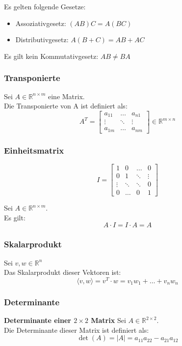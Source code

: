 \documentclass[10pt,a4paper]{article}
\begin{document}
Es gelten folgende Gesetze:
\begin{itemize}
	\item Assoziativgesetz: $(AB)C = A(BC)$
	\item Distributivgesetz: $A(B + C) = AB + AC$
\end{itemize}

Es gilt kein Kommutativgesetz:
$AB ≠ BA$

\subsubsection{Transponierte}
Sei $A \in \mathbb{R}^{n \times m}$ eine Matrix. \\
Die Transponierte von A ist definiert als:
$$
	A^T =  \begin{bmatrix}
	a_{11} & \dots & a_{n1} \\
	\vdots & \ddots & \vdots \\
	a_{1m} & \dots & a_{nm}
	\end{bmatrix} \in \mathbb{R}^{m \times n}
$$

\subsubsection{Einheitsmatrix}
$$
I = \begin{bmatrix}
1 & 0 & \dots & 0 \\
0 & 1 & \ddots & \vdots \\
\vdots & \ddots & \ddots & 0 \\
0 & \dots & 0 & 1
\end{bmatrix}
$$

Sei $A \in \mathbb{R}^{n \times m}$. \\
Es gilt:
$$
A ⋅ I = I ⋅ A = A
$$

\subsubsection{Skalarprodukt}
Sei $v, w \in \mathbb{R}^n$ \\
Das Skalarprodukt dieser Vektoren ist:
$$
\langle v, w \rangle = v^T ⋅ w = v_1w_1 + \dots + v_nw_n
$$

\subsubsection{Determinante}
\textbf{Determinante einer $2 \times 2$ Matrix}
Sei $A \in \mathbb{R}^{2 \times 2}$. \\
Die Determinante dieser Matrix ist definiert als:
$$
	\det(A) = |A| = a_{11}a_{22} - a_{21}a_{12}
$$
\end{document}
